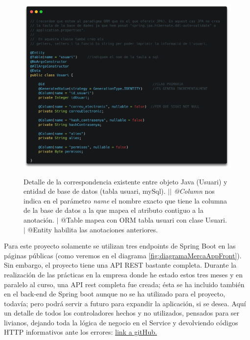 \documentclass[a4paper,12pt]{report}
\begin{document}
				\FloatBarrier
				\setlength{\belowcaptionskip}{3pt}
				\begin{figure}[H]
					\centering
					\caption{Detalle de la correspondencia existente entre objeto Java (Usuari) y entidad de base de datos (tabla usuari, mySql). $||$  \textit{@Column} nos indica en el parámetro \textit{name} el nombre exacto que tiene la columna de la base de datos a la que mapea el atributo contiguo a la anotación. $|$ @Table mapea con ORM tabla usuari con clase Usuari. $|$ @Entity habilita las anotaciones anteriores.}
					\includegraphics[width=1\linewidth]{img/detallModelUsuariSBoot}
					\label{fig:detallModelUsuariSBoot}
				\end{figure}
				\FloatBarrier
				
				Para este proyecto solamente se utilizan tres endpoints de Spring Boot en las páginas públicas (como veremos en el diagrama \ref{fig:diagramaMercaAppFront}). Sin embargo, el proyecto tiene una API REST bastante completa. Durante la realización de las prácticas en la empresa donde he estado estos tres meses y en paralelo al curso, una
				API rest completa fue creada; ésta se ha incluido también en el back-end de Spring boot aunque no se ha utilizado para el proyecto, todavía; pero podrá servir a futuro para expandir la aplicación, si se desea. Aquí un detalle de todos los controladores hechos y no utilizados, pensados para ser livianos, dejando toda la lógica de negocio en el Service y devolviendo códigos HTTP informativos ante los errores: \href{https://github.com/blackcub3s/mercApp/blob/69c9dffc3a959f9b19b43eaf13236ba99250878e/APP%20WEB/__springboot__produccio__/app/src/main/java/miApp/app/Usuaris/controlador/UsuariControlador.java#L150-L274}{link a gitHub.}
				
\end{document}
